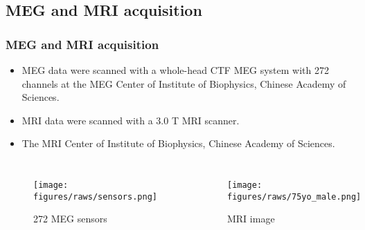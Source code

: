 \documentclass[aspectratio=169]{beamer}
\begin{document}
\subsection{MEG and MRI acquisition}
\begin{frame}
    \frametitle{MEG and MRI acquisition}

    \begin{itemize}
        \item MEG data were scanned with a whole-head CTF MEG system with 272 channels at the MEG Center of Institute of Biophysics, Chinese Academy of Sciences.
        \item MRI data were scanned with a 3.0 T MRI scanner.
        \item The MRI Center of Institute of Biophysics, Chinese Academy of Sciences.
    \end{itemize}

    \begin{columns}
        \begin{figure}[h]
            \centering
            \texttt{[image: figures/raws/sensors.png]}
            \caption{272 MEG sensors}
        \end{figure}

        \begin{figure}[h]
            \centering
            \texttt{[image: figures/raws/75yo\_male.png]}
            \caption{MRI image}
        \end{figure}

    \end{columns}

\end{frame}

\end{document}
